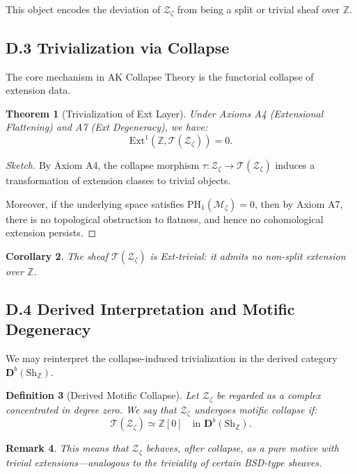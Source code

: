 \documentclass[11pt]{article}
\newtheorem{theorem}{Theorem}[section]
\newtheorem{definition}[theorem]{Definition}
\newtheorem{corollary}[theorem]{Corollary}
\newtheorem{remark}[theorem]{Remark}
\begin{document}
This object encodes the deviation of $\mathcal{Z}_\zeta$ from being a split or trivial sheaf over $\mathbb{Z}$.

\subsection*{D.3 Trivialization via Collapse}

The core mechanism in AK Collapse Theory is the functorial collapse of extension data.

\begin{theorem}[Trivialization of Ext Layer]
Under Axioms A4 (Extensional Flattening) and A7 (Ext Degeneracy), we have:
\[
\mathrm{Ext}^1(\mathbb{Z}, \mathcal{T}(\mathcal{Z}_\zeta)) = 0.
\]
\end{theorem}

\begin{proof}[Sketch]
By Axiom A4, the collapse morphism $\tau: \mathcal{Z}_\zeta \to \mathcal{T}(\mathcal{Z}_\zeta)$  
induces a transformation of extension classes to trivial objects.

Moreover, if the underlying space satisfies $\mathrm{PH}_1(\mathcal{M}_\zeta) = 0$, then by Axiom A7,  
there is no topological obstruction to flatness, and hence no cohomological extension persists.
\end{proof}

\begin{corollary}
The sheaf $\mathcal{T}(\mathcal{Z}_\zeta)$ is Ext-trivial: it admits no non-split extension over $\mathbb{Z}$.  
\end{corollary}

\subsection*{D.4 Derived Interpretation and Motific Degeneracy}

We may reinterpret the collapse-induced trivialization in the derived category $\mathbf{D}^b(\text{Sh}_\mathbb{Z})$.

\begin{definition}[Derived Motific Collapse]
Let $\mathcal{Z}_\zeta$ be regarded as a complex concentrated in degree zero.  
We say that $\mathcal{Z}_\zeta$ undergoes motific collapse if:
\[
\mathcal{T}(\mathcal{Z}_\zeta) \simeq \mathbb{Z}[0] \quad \text{in } \mathbf{D}^b(\text{Sh}_\mathbb{Z}).
\]
\end{definition}

\begin{remark}
This means that $\mathcal{Z}_\zeta$ behaves, after collapse, as a pure motive with trivial extensions—analogous to the triviality of certain BSD-type sheaves.
\end{remark}
\end{document}
